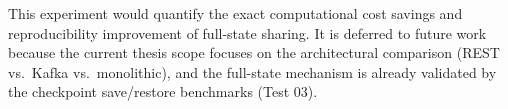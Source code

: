 \documentclass[12pt,a4paper]{article}
\begin{document}
This experiment would quantify the exact computational cost savings and reproducibility improvement of full-state sharing. It is deferred to future work because the current thesis scope focuses on the architectural comparison (REST vs.\ Kafka vs.\ monolithic), and the full-state mechanism is already validated by the checkpoint save/restore benchmarks (Test 03).
\end{document}
